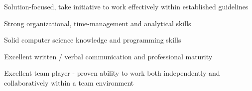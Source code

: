  \vspace{1em}
 \begin{cvitems}
 	\item
 	{Solution-focused, take initiative to work effectively within established guidelines}
 	\item 
 	{Strong organizational, time-management and analytical skills}
 	\item
 	{Solid computer science knowledge and programming skills}
 	\item
 	{Excellent written / verbal communication and professional maturity}
 	\item 
 	{Excellent team player - proven ability to work both independently and collaboratively within a team environment}
 	
 	
 	
 	
 \end{cvitems}
 \vspace{1em}